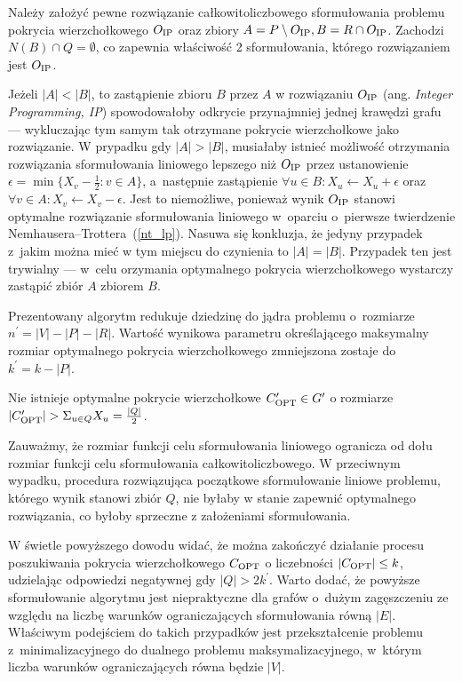 \begin{bproof}
  Należy założyć pewne rozwiązanie całkowitoliczbowego sformułowania problemu 
  pokrycia wierzchołkowego $O_{\textnormal{IP}}$ oraz zbiory 
  ${A = P \setminus O_{\textnormal{IP}}, B = R \cap O_{\textnormal{IP}}}$.
  Zachodzi $N(B) \cap Q = \emptyset$, co zapewnia właściwość 2 sformułowania, którego rozwiązaniem jest $O_{\textnormal{IP}}$.

  Jeżeli $|A|<|B|$, to zastąpienie zbioru $B$ przez $A$ w rozwiązaniu $O_{\textnormal{IP}}$ (ang. \emph{Integer Programming, IP}) spowodowałoby odkrycie przynajmniej jednej krawędzi grafu --- wykluczając tym samym tak otrzymane pokrycie wierzchołkowe jako rozwiązanie.
  W prypadku gdy $|A|>|B|$, musiałaby istnieć możliwość otrzymania rozwiązania sformułowania liniowego lepszego niż $O_{\textnormal{IP}}$ przez ustanowienie $\epsilon = \min\{X_v-\frac{1}{2}: v \in A\}$, a~następnie
  zastąpienie $\forall{u \in B}:X_u \leftarrow X_u + \epsilon$ oraz $\forall{v \in A}: X_v \leftarrow X_v -\epsilon$.
  Jest to niemożliwe, ponieważ wynik $O_{\textnormal{IP}}$ stanowi optymalne rozwiązanie sformułowania liniowego w~oparciu o~pierwsze twierdzenie Nemhausera--Trottera~(\ref{nt_lp}).
  Nasuwa się konkluzja, że jedyny przypadek z~jakim można mieć w tym miejscu do czynienia to $|A|=|B|$.
  Przypadek ten jest trywialny --- w~celu orzymania optymalnego pokrycia wierzchołkowego wystarczy zastąpić zbiór $A$ zbiorem $B$.
\end{bproof}
Prezentowany algorytm redukuje dziedzinę do jądra problemu o~rozmiarze $n^\prime=|V|-|P|-|R|$.
Wartość wynikowa parametru określającego maksymalny rozmiar optymalnego pokrycia wierzchołkowego zmniejszona zostaje do $k^\prime=k-|P|$.
\begin{theorem}
  Nie istnieje optymalne pokrycie wierzchołkowe $C^\prime_{\textnormal{OPT}}\in G^\prime$ o rozmiarze $|C^\prime_{\textnormal{OPT}}|>\Sigma_{u\in Q}X_u=\frac{|Q|}{2}$.
\end{theorem}
\begin{bproof}
  Zauważmy, że rozmiar funkcji celu sformułowania liniowego ogranicza od dołu rozmiar funkcji celu sformułowania całkowitoliczbowego.
  W przeciwnym wypadku, procedura rozwiązująca początkowe sformułowanie liniowe problemu, którego wynik stanowi zbiór $Q$, nie byłaby w stanie zapewnić optymalnego rozwiązania, co byłoby sprzeczne z założeniami sformułowania.
\end{bproof}
\par{
  W świetle powyższego dowodu widać, że można zakończyć działanie procesu poszukiwania pokrycia wierzchołkowego $C_{\textnormal{OPT}}$ o liczebności $|C_{\textnormal{OPT}}|\leq k$, udzielając odpowiedzi negatywnej gdy $|Q|>2k^\prime$.
  Warto dodać, że powyższe sformułowanie algorytmu jest niepraktyczne dla grafów o~dużym zagęszczeniu ze względu na liczbę warunków ograniczających sformułowania równą $|E|$.
  Właściwym podejściem do takich przypadków jest przekształcenie problemu z~minimalizacyjnego do dualnego problemu maksymalizacyjnego, w~którym liczba warunków ograniczających równa będzie $|V|$.
}

